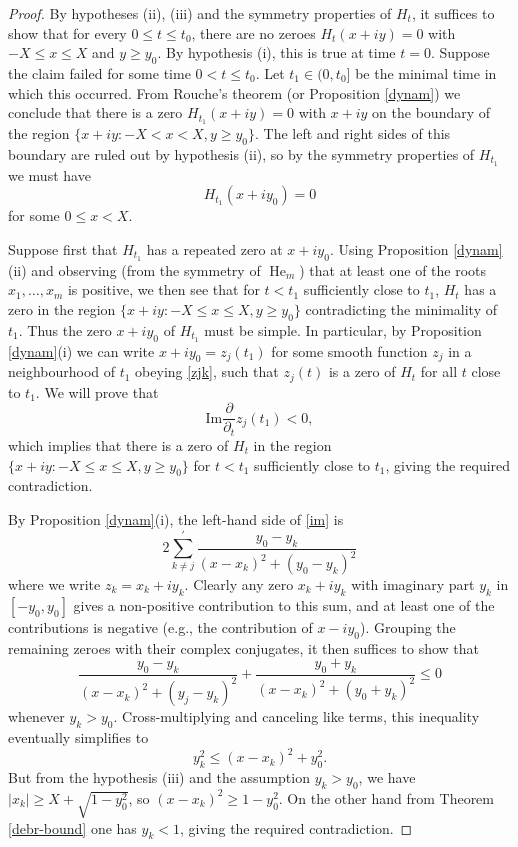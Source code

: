 \begin{proof}  By hypotheses (ii), (iii) and the symmetry properties of $H_t$, it suffices to show that for every $0 \leq t \leq t_0$, there are no zeroes $H_t(x+iy) = 0$ with $-X \leq x \leq X$ and $y \geq y_0$.  By hypothesis (i), this is true at time $t=0$.  Suppose the claim failed for some time $0 < t \leq t_0$.  Let $t_1 \in (0,t_0]$ be the minimal time in which this occurred.  From Rouche's theorem (or Proposition \ref{dynam}) we conclude that there is a zero $H_{t_1}(x+iy)=0$ with $x+iy$ on the boundary of the region $\{ x+iy: -X < x < X, y \geq y_0 \}$.  The left and right sides of this boundary are ruled out by hypothesis (ii), so by the symmetry properties of $H_{t_1}$ we must have
$$ H_{t_1}(x+iy_0) = 0$$
for some $0 \leq x < X$.

Suppose first that $H_{t_1}$ has a repeated zero at $x+iy_0$.  Using Proposition \ref{dynam}(ii) and observing (from the symmetry of $\operatorname{He}_m$) that at least one of the roots $x_1,\dots,x_m$ is positive, we then see that for $t<t_1$ sufficiently close to $t_1$, $H_t$ has a zero in the region $\{ x+iy: -X \leq x \leq X, y \geq y_0 \}$ contradicting the minimality of $t_1$.  Thus the zero $x+iy_0$ of $H_{t_1}$ must be simple.  In particular, by Proposition \ref{dynam}(i) we can write $x+iy_0 = z_j(t_1)$ for some smooth function $z_j$ in a neighbourhood of $t_1$ obeying \eqref{zjk}, such that $z_j(t)$ is a zero of $H_t$ for all $t$ close to $t_1$.  We will prove that
\begin{equation}\label{im}
\mathrm{Im} \frac{\partial}{\partial_t} z_j( t_1 ) < 0,
\end{equation}
which implies that there is a zero of $H_t$ in the region $\{ x+iy: -X \leq x \leq X, y \geq y_0 \}$  for $t<t_1$ sufficiently close to $t_1$, giving the required contradiction.  

By Proposition \ref{dynam}(i), the left-hand side of \eqref{im} is
$$ 2 \sum_{k \neq j}^{\prime} \frac{y_0 - y_k}{(x-x_k)^2 + (y_0-y_k)^2}$$
where we write $z_k = x_k + i y_k$.  Clearly any zero $x_k+iy_k$ with imaginary part $y_k$ in $[-y_0,y_0]$ gives a non-positive contribution to this sum, and at least one of the contributions is negative (e.g., the contribution of $x - iy_0$).  Grouping the remaining zeroes with their complex conjugates, it then suffices to show that
$$ \frac{y_0 - y_k}{(x-x_k)^2 + (y_j-y_k)^2} + \frac{y_0 + y_k}{(x-x_k)^2 + (y_0+y_k)^2} \leq 0$$
whenever $y_k > y_0$.  Cross-multiplying and canceling like terms, this inequality eventually simplifies to
$$ y_k^2 \leq (x-x_k)^2 + y_0^2.$$
But from the hypothesis (iii) and the assumption $y_k > y_0$, we have $|x_k| \geq X+\sqrt{1-y_0^2}$, so $(x-x_k)^2 \geq 1-y_0^2$.  On the other hand from Theorem \ref{debr-bound} one has $y_k < 1$, giving the required contradiction.
\end{proof}
